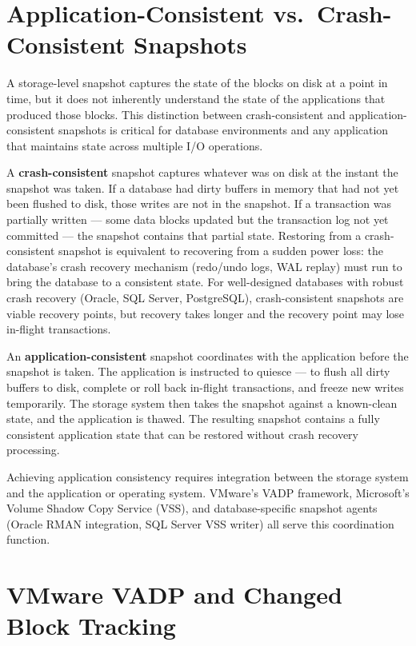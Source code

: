 \section{Application-Consistent vs.\ Crash-Consistent Snapshots}

A storage-level snapshot captures the state of the blocks on disk at a point in time, but it does not inherently understand the state of the applications that produced those blocks. This distinction between crash-consistent and application-consistent snapshots is critical for database environments and any application that maintains state across multiple I/O operations.

A \textbf{crash-consistent} snapshot captures whatever was on disk at the instant the snapshot was taken. If a database had dirty buffers in memory that had not yet been flushed to disk, those writes are not in the snapshot. If a transaction was partially written --- some data blocks updated but the transaction log not yet committed --- the snapshot contains that partial state. Restoring from a crash-consistent snapshot is equivalent to recovering from a sudden power loss: the database's crash recovery mechanism (redo/undo logs, WAL replay) must run to bring the database to a consistent state. For well-designed databases with robust crash recovery (Oracle, SQL Server, PostgreSQL), crash-consistent snapshots are viable recovery points, but recovery takes longer and the recovery point may lose in-flight transactions.

An \textbf{application-consistent} snapshot coordinates with the application before the snapshot is taken. The application is instructed to quiesce --- to flush all dirty buffers to disk, complete or roll back in-flight transactions, and freeze new writes temporarily. The storage system then takes the snapshot against a known-clean state, and the application is thawed. The resulting snapshot contains a fully consistent application state that can be restored without crash recovery processing.

Achieving application consistency requires integration between the storage system and the application or operating system. VMware's VADP framework, Microsoft's Volume Shadow Copy Service (VSS), and database-specific snapshot agents (Oracle RMAN integration, SQL Server VSS writer) all serve this coordination function.

\section{VMware VADP and Changed Block Tracking}

